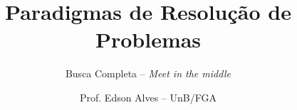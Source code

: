 \title{Paradigmas de Resolução de Problemas}
\subtitle{Busca Completa -- {\it Meet in the middle}}
\author{Prof. Edson Alves -- UnB/FGA}
\date{}
